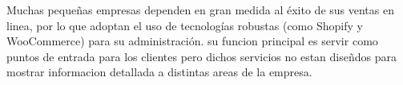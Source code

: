 \thispagestyle{fancy}
\setcounter{page}{1}  %
\thispagestyle{empty}  %
Muchas pequeñas empresas dependen en gran medida al éxito de sus ventas en linea,
por lo que adoptan el uso de tecnologías robustas (como Shopify y WooCommerce) para su administración.
su funcion principal es servir como puntos de entrada para los clientes pero
dichos servicios no estan diseñdos para mostrar informacion detallada a distintas areas de la empresa.